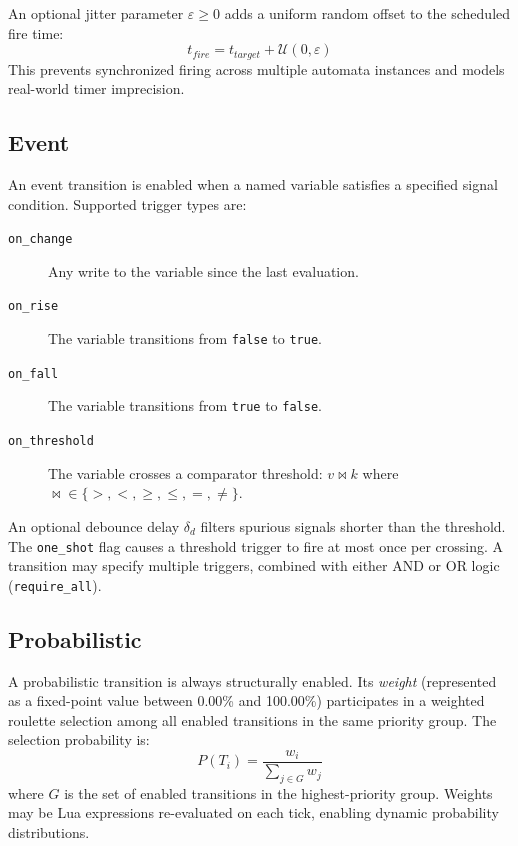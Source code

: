 An optional jitter parameter $\varepsilon \geq 0$ adds a uniform random offset to the scheduled fire time:
\begin{equation}
  t_\mathit{fire} = t_\mathit{target} + \mathcal{U}(0, \varepsilon)
\end{equation}
This prevents synchronized firing across multiple automata instances and models real-world timer imprecision.

\subsection{Event}

An event transition is enabled when a named variable satisfies a specified signal condition. Supported trigger types are:
\begin{description}
  \item[\texttt{on\_change}] Any write to the variable since the last evaluation.
  \item[\texttt{on\_rise}] The variable transitions from \texttt{false} to \texttt{true}.
  \item[\texttt{on\_fall}] The variable transitions from \texttt{true} to \texttt{false}.
  \item[\texttt{on\_threshold}] The variable crosses a comparator threshold: $v \bowtie k$ where ${\bowtie} \in \{>, <, \geq, \leq, =, \neq\}$.
\end{description}

An optional debounce delay $\delta_d$ filters spurious signals shorter than the threshold. The \texttt{one\_shot} flag causes a threshold trigger to fire at most once per crossing. A transition may specify multiple triggers, combined with either AND or OR logic (\texttt{require\_all}).

\subsection{Probabilistic}

A probabilistic transition is always structurally enabled. Its \textit{weight} (represented as a fixed-point value between 0.00\% and 100.00\%) participates in a weighted roulette selection among all enabled transitions in the same priority group. The selection probability is:
\begin{equation}
  P(T_i) = \frac{w_i}{\displaystyle\sum_{j \in G} w_j}
  \label{eq:roulette}
\end{equation}
where $G$ is the set of enabled transitions in the highest-priority group. Weights may be Lua expressions re-evaluated on each tick, enabling dynamic probability distributions.

